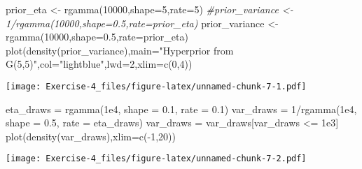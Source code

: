 \documentclass[
]{article}
\newenvironment{Shaded}{\begin{snugshade}}{\end{snugshade}}
\newcommand{\AttributeTok}[1]{\textcolor[rgb]{0.77,0.63,0.00}{#1}}
\newcommand{\CommentTok}[1]{\textcolor[rgb]{0.56,0.35,0.01}{\textit{#1}}}
\newcommand{\DecValTok}[1]{\textcolor[rgb]{0.00,0.00,0.81}{#1}}
\newcommand{\FloatTok}[1]{\textcolor[rgb]{0.00,0.00,0.81}{#1}}
\newcommand{\FunctionTok}[1]{\textcolor[rgb]{0.00,0.00,0.00}{#1}}
\newcommand{\NormalTok}[1]{#1}
\newcommand{\OtherTok}[1]{\textcolor[rgb]{0.56,0.35,0.01}{#1}}
\newcommand{\SpecialCharTok}[1]{\textcolor[rgb]{0.00,0.00,0.00}{#1}}
\newcommand{\StringTok}[1]{\textcolor[rgb]{0.31,0.60,0.02}{#1}}
\begin{document}
\begin{Shaded}
\begin{Highlighting}[]
\NormalTok{prior\_eta }\OtherTok{\textless{}{-}} \FunctionTok{rgamma}\NormalTok{(}\DecValTok{10000}\NormalTok{,}\AttributeTok{shape=}\DecValTok{5}\NormalTok{,}\AttributeTok{rate=}\DecValTok{5}\NormalTok{)}
\CommentTok{\#prior\_variance \textless{}{-} 1/rgamma(10000,shape=0.5,rate=prior\_eta)}
\NormalTok{prior\_variance }\OtherTok{\textless{}{-}} \FunctionTok{rgamma}\NormalTok{(}\DecValTok{10000}\NormalTok{,}\AttributeTok{shape=}\FloatTok{0.5}\NormalTok{,}\AttributeTok{rate=}\NormalTok{prior\_eta)}
\FunctionTok{plot}\NormalTok{(}\FunctionTok{density}\NormalTok{(prior\_variance),}\AttributeTok{main=}\StringTok{"Hyperprior from G(5,5)"}\NormalTok{,}\AttributeTok{col=}\StringTok{"lightblue"}\NormalTok{,}\AttributeTok{lwd=}\DecValTok{2}\NormalTok{,}\AttributeTok{xlim=}\FunctionTok{c}\NormalTok{(}\DecValTok{0}\NormalTok{,}\DecValTok{4}\NormalTok{))}
\end{Highlighting}
\end{Shaded}

\texttt{[image: Exercise-4\_files/figure-latex/unnamed-chunk-7-1.pdf]}

\begin{Shaded}
\begin{Highlighting}[]
\NormalTok{eta\_draws }\OtherTok{=} \FunctionTok{rgamma}\NormalTok{(}\FloatTok{1e4}\NormalTok{, }\AttributeTok{shape =} \FloatTok{0.1}\NormalTok{, }\AttributeTok{rate =} \FloatTok{0.1}\NormalTok{)}
\NormalTok{var\_draws }\OtherTok{=} \DecValTok{1}\SpecialCharTok{/}\FunctionTok{rgamma}\NormalTok{(}\FloatTok{1e4}\NormalTok{, }\AttributeTok{shape =} \FloatTok{0.5}\NormalTok{, }\AttributeTok{rate =}\NormalTok{ eta\_draws)}
\NormalTok{var\_draws }\OtherTok{=}\NormalTok{ var\_draws[var\_draws }\SpecialCharTok{\textless{}=} \FloatTok{1e3}\NormalTok{]}
\FunctionTok{plot}\NormalTok{(}\FunctionTok{density}\NormalTok{(var\_draws),}\AttributeTok{xlim=}\FunctionTok{c}\NormalTok{(}\SpecialCharTok{{-}}\DecValTok{1}\NormalTok{,}\DecValTok{20}\NormalTok{))}
\end{Highlighting}
\end{Shaded}

\texttt{[image: Exercise-4\_files/figure-latex/unnamed-chunk-7-2.pdf]}
\end{document}
